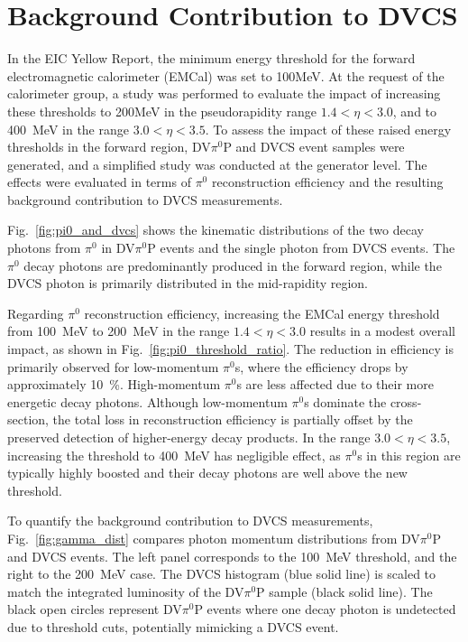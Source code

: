 \documentclass[letterpaper,12pt]{article}
\begin{document}
\section{Background Contribution to DVCS}\label{sec:Background}
In the EIC Yellow Report, the minimum energy threshold for the forward electromagnetic calorimeter (EMCal) was set to 100MeV. At the request of the calorimeter group, a study was performed to evaluate the impact of increasing these thresholds to 200MeV in the pseudorapidity range $1.4 < \eta < 3.0$, and to 400~MeV in the range $3.0 < \eta < 3.5$. To assess the impact of these raised energy thresholds in the forward region, DV$\pi^{0}$P and DVCS event samples were generated, and a simplified study was conducted at the generator level. The effects were evaluated in terms of $\pi^{0}$ reconstruction efficiency and the resulting background contribution to DVCS measurements.

Fig.~\ref{fig:pi0_and_dvcs} shows the kinematic distributions of the two decay photons from $\pi^{0}$ in DV$\pi^{0}$P events and the single photon from DVCS events. The $\pi^{0}$ decay photons are predominantly produced in the forward region, while the DVCS photon is primarily distributed in the mid-rapidity region.

Regarding $\pi^{0}$ reconstruction efficiency, increasing the EMCal energy threshold from 100~MeV to 200~MeV in the range $1.4 < \eta < 3.0$ results in a modest overall impact, as shown in Fig.~\ref{fig:pi0_threshold_ratio}. The reduction in efficiency is primarily observed for low-momentum $\pi^{0}$s, where the efficiency drops by approximately 10~\%. High-momentum $\pi^{0}$s are less affected due to their more energetic decay photons. Although low-momentum $\pi^{0}$s dominate the cross-section, the total loss in reconstruction efficiency is partially offset by the preserved detection of higher-energy decay products. In the range $3.0 < \eta < 3.5$, increasing the threshold to 400~MeV has negligible effect, as $\pi^{0}$s in this region are typically highly boosted and their decay photons are well above the new threshold.

To quantify the background contribution to DVCS measurements, Fig.~\ref{fig:gamma_dist} compares photon momentum distributions from DV$\pi^{0}$P and DVCS events. The left panel corresponds to the 100~MeV threshold, and the right to the 200~MeV case. The DVCS histogram (blue solid line) is scaled to match the integrated luminosity of the DV$\pi^{0}$P sample (black solid line). The black open circles represent DV$\pi^{0}$P events where one decay photon is undetected due to threshold cuts, potentially mimicking a DVCS event.
\end{document}
